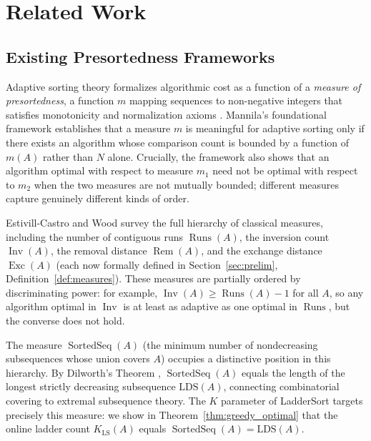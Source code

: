 \documentclass[12pt,a4paper]{article}
\theoremstyle{plain}
\theoremstyle{definition}
\DeclareMathOperator{\Runs}{Runs}
\DeclareMathOperator{\Inv}{Inv}
\DeclareMathOperator{\Rem}{Rem}
\DeclareMathOperator{\Exc}{Exc}
\DeclareMathOperator{\SortedSeq}{SortedSeq}
\begin{document}
\section{Related Work}
\label{sec:related}

\subsection{Existing Presortedness Frameworks}
\label{sec:measures}

Adaptive sorting theory formalizes algorithmic cost as a function of a
\emph{measure of presortedness}, a function $m$ mapping sequences to
non-negative integers that satisfies monotonicity and normalization
axioms \cite{Mannila1985}.  Mannila's foundational framework establishes
that a measure $m$ is meaningful for adaptive sorting only if there exists an
algorithm whose comparison count is bounded by a function of $m(A)$ rather
than $N$ alone.  Crucially, the framework also shows that an algorithm
optimal with respect to measure $m_1$ need not be optimal with respect to
$m_2$ when the two measures are not mutually bounded; different measures
capture genuinely different kinds of order.

Estivill-Castro and Wood \cite{EstivillWood1992} survey the full hierarchy
of classical measures, including the number of contiguous runs $\Runs(A)$,
the inversion count $\Inv(A)$, the removal distance $\Rem(A)$, and the
exchange distance $\Exc(A)$ (each now formally defined in
Section~\ref{sec:prelim}, Definition~\ref{def:measures}).  These measures
are partially ordered by discriminating power: for example,
$\Inv(A) \ge \Runs(A) - 1$ for all $A$, so any algorithm optimal in $\Inv$
is at least as adaptive as one optimal in $\Runs$, but the converse does not
hold.

The measure $\SortedSeq(A)$ (the minimum number of nondecreasing
subsequences whose union covers $A$) occupies a distinctive position in
this hierarchy.  By Dilworth's Theorem \cite{Dilworth1950},
$\SortedSeq(A)$ equals the length of the longest strictly decreasing
subsequence $\mathrm{LDS}(A)$, connecting combinatorial covering to
extremal subsequence theory.
The $K$ parameter of LadderSort targets precisely this measure: we show
in Theorem~\ref{thm:greedy_optimal} that the online ladder count
$K_{\mathrm{LS}}(A)$ equals $\SortedSeq(A) = \mathrm{LDS}(A)$.
\end{document}
